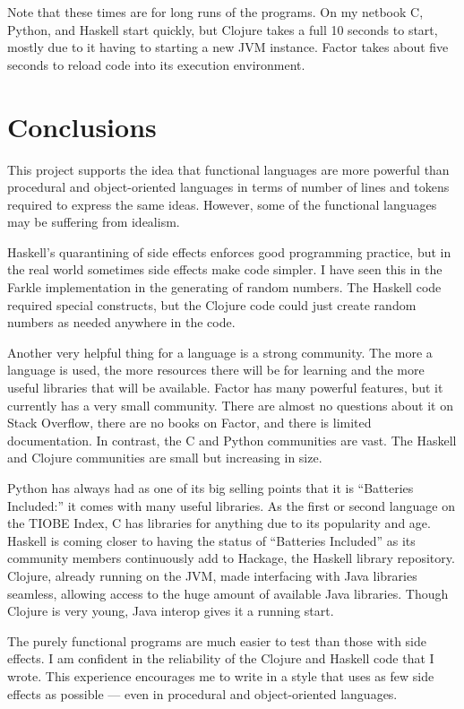 \documentclass{article}
\begin{document}
Note that these times are for long runs of the programs.  On my netbook C,
Python, and Haskell start quickly, but Clojure takes a full 10
seconds to start, mostly due to it having to starting a new JVM instance.  Factor
takes about five seconds to reload code into its execution environment.

\section{Conclusions}
This project supports the idea that functional languages are more powerful than
procedural and object-oriented languages in terms of number of lines and tokens
required to express the same ideas.  However, some of the functional languages
may be suffering from idealism.

Haskell's quarantining of side effects enforces good programming practice, but
in the real world sometimes side effects make code simpler.  I have seen this
in the Farkle implementation in the generating of random numbers.  The Haskell
code required special constructs, but the Clojure code could just create random
numbers as needed anywhere in the code.

Another very helpful thing for a language is a strong community.  The more a
language is used, the more resources there will be for learning and the more
useful libraries that will be available.  Factor has many powerful features, but
it currently has a very small community.  There are almost no questions about it on
Stack Overflow, there are no books on Factor, and there is limited
documentation.  In contrast, the C and Python communities are vast.  The Haskell
and Clojure communities are small but increasing in size.

Python has always had as one of its big selling points that it is ``Batteries
Included:'' it comes with many useful libraries.  As the first or second
language on the TIOBE Index, C has libraries for anything due to its popularity
and age.  Haskell is coming closer to having the status of ``Batteries
Included'' as its community members continuously add to Hackage, the Haskell
library repository.  Clojure, already running on the JVM, made interfacing with
Java libraries seamless, allowing access to the huge amount of available Java
libraries.  Though Clojure is very young, Java interop gives it a running
start.

The purely functional programs are much easier to test than those with side
effects.  I am confident in the reliability of the Clojure and Haskell code that
I wrote.  This experience encourages me to write in a style that uses as few
side effects as possible --- even in procedural and object-oriented languages.  
\end{document}
